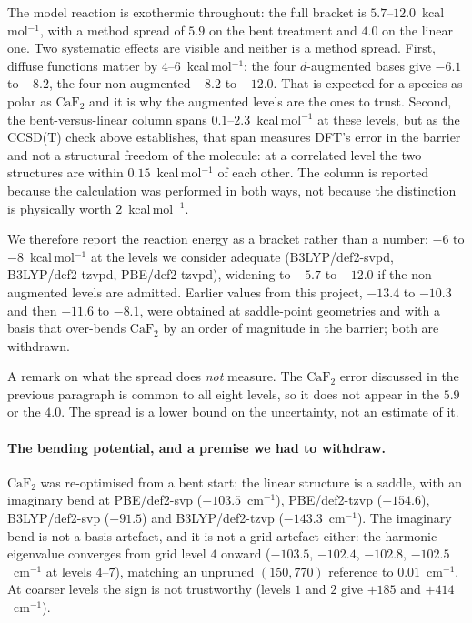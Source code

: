 \documentclass[11pt,a4paper]{article}
\theoremstyle{plain}
\theoremstyle{definition}
\theoremstyle{remark}
\begin{document}
The model reaction is exothermic throughout: the full bracket is
$5.7$--$12.0$~kcal\,mol$^{-1}$, with a method spread of $5.9$ on the bent treatment
and $4.0$ on the linear one. Two systematic effects are visible and neither is a
method spread. First, diffuse functions matter by $4$--$6$~kcal\,mol$^{-1}$: the
four $d$-augmented bases give $-6.1$ to $-8.2$, the four non-augmented $-8.2$ to
$-12.0$. That is expected for a species as polar as $\mathrm{CaF_2}$ and it is why
the augmented levels are the ones to trust. Second, the bent-versus-linear column spans
$0.1$--$2.3$~kcal\,mol$^{-1}$ at these levels, but as the CCSD(T) check above
establishes, that span measures DFT's error in the barrier and not a structural
freedom of the molecule: at a correlated level the two structures are within
$0.15$~kcal\,mol$^{-1}$ of each other. The column is reported because the
calculation was performed in both ways, not because the distinction is physically
worth $2$~kcal\,mol$^{-1}$.

We therefore report the reaction energy as a bracket rather than a number:
$-6$ to $-8$~kcal\,mol$^{-1}$ at the levels we consider adequate
(B3LYP/def2-svpd, B3LYP/def2-tzvpd, PBE/def2-tzvpd), widening to $-5.7$ to
$-12.0$ if the non-augmented levels are admitted. Earlier values from this project,
$-13.4$ to $-10.3$ and then $-11.6$ to $-8.1$, were obtained at saddle-point
geometries and with a basis that over-bends $\mathrm{CaF_2}$ by an order of
magnitude in the barrier; both are withdrawn.

A remark on what the spread does \emph{not} measure. The $\mathrm{CaF_2}$ error
discussed in the previous paragraph is common to all eight levels, so it does not
appear in the $5.9$ or the $4.0$. The spread is a lower bound on the uncertainty,
not an estimate of it.

\paragraph{The bending potential, and a premise we had to withdraw.}
$\mathrm{CaF_2}$ was re-optimised from a bent start; the linear structure is a
saddle, with an imaginary bend at PBE/def2-svp ($-103.5$~cm$^{-1}$), PBE/def2-tzvp
($-154.6$), B3LYP/def2-svp ($-91.5$) and B3LYP/def2-tzvp ($-143.3$~cm$^{-1}$). The
imaginary bend is not a basis artefact, and it is not a grid artefact either: the
harmonic eigenvalue converges from grid level $4$ onward ($-103.5$, $-102.4$,
$-102.8$, $-102.5$~cm$^{-1}$ at levels $4$--$7$), matching an unpruned $(150,770)$
reference to $0.01$~cm$^{-1}$. At coarser levels the sign is not trustworthy
(levels $1$ and $2$ give $+185$ and $+414$~cm$^{-1}$).
\end{document}
